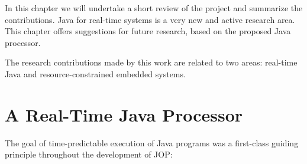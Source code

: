 
In this chapter we will undertake a short review of the project and
summarize the contributions. Java for real-time systems is a very new
and active research area. This chapter offers suggestions for future
research, based on the proposed Java processor.

The research contributions made by this work are related to two
areas: real-time Java and resource-constrained embedded systems.

\section{A Real-Time Java Processor}

The goal of time-predictable execution of Java programs was a
first-class guiding principle throughout the development of JOP:

